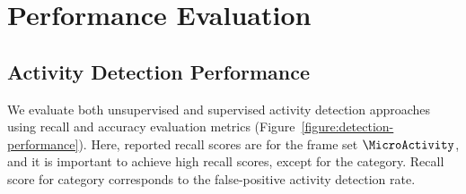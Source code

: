 \section{Performance Evaluation}\label{section:performance-evaluation}
\subsection{Activity Detection Performance}
We evaluate both unsupervised and supervised activity detection approaches using recall and accuracy evaluation metrics (Figure~\ref{figure:detection-performance}).
Here, reported recall scores are for the frame set $\MicroActivity$, and it is important to achieve high recall scores, except for the \QuiescentOther category.
Recall score for \QuiescentOther category corresponds to the false-positive activity detection rate.

